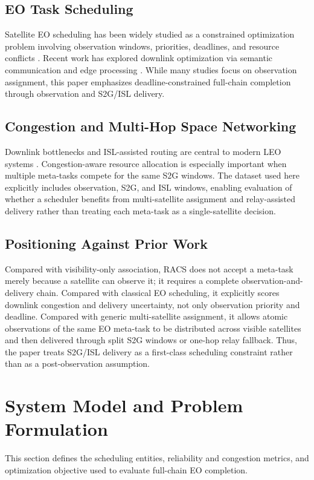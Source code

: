 \documentclass[conference]{IEEEtran}
\begin{document}
\subsection{EO Task Scheduling}
Satellite EO scheduling has been widely studied as a constrained optimization problem involving observation windows, priorities, deadlines, and resource conflicts \cite{wang2019survey,chen2020satellite}. Recent work has explored downlink optimization via semantic communication and edge processing \cite{hassan2024semantic,mercado2024vessel}. While many studies focus on observation assignment, this paper emphasizes deadline-constrained full-chain completion through observation and S2G/ISL delivery.

\subsection{Congestion and Multi-Hop Space Networking}
Downlink bottlenecks and ISL-assisted routing are central to modern LEO systems \cite{kodheli2021survey,lu2024opensn}. Congestion-aware resource allocation is especially important when multiple meta-tasks compete for the same S2G windows. The dataset used here explicitly includes observation, S2G, and ISL windows, enabling evaluation of whether a scheduler benefits from multi-satellite assignment and relay-assisted delivery rather than treating each meta-task as a single-satellite decision.

\subsection{Positioning Against Prior Work}
Compared with visibility-only association, RACS does not accept a meta-task merely because a satellite can observe it; it requires a complete observation-and-delivery chain. Compared with classical EO scheduling, it explicitly scores downlink congestion and delivery uncertainty, not only observation priority and deadline. Compared with generic multi-satellite assignment, it allows atomic observations of the same EO meta-task to be distributed across visible satellites and then delivered through split S2G windows or one-hop relay fallback. Thus, the paper treats S2G/ISL delivery as a first-class scheduling constraint rather than as a post-observation assumption.

\section{System Model and Problem Formulation}
This section defines the scheduling entities, reliability and congestion metrics, and optimization objective used to evaluate full-chain EO completion.
\end{document}
